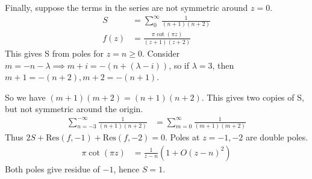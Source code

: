 \documentclass[a4paper, 11pt, normalem]{report}
\begin{document}
Finally, suppose the terms in the series are not symmetric around $z = 0$.
\begin{align}
    S &= \sum_0^\infty \frac{1}{(n+1)(n+2)} \\
    f(z) &= \frac{\pi\cot(\pi z)}{(z+1)(z+2)}
\end{align}
This gives S from poles for $z = n \geq 0$. 
Consider $m = -n-\lambda \implies m+i = -(n+(\lambda-i))$, so if $\lambda = 3$, then $m+1 = -(n+2), m+2 = -(n+1)$. 

So we have $(m+1)(m+2) = (n+1)(n+2)$. 
This gives two copies of S, but not symmetric around the origin.
\begin{align}
    \sum_{n=-3}^{-\infty} \frac{1}{(n+1)(n+2)} &= \sum_{m=0}^\infty \frac{1}{(m+1)(m+2)}
\end{align}
Thus $2S + \text{Res}(f, -1) + \text{Res}(f,-2) = 0$. 
Poles at $z = -1,-2$ are double poles. 
\begin{align}
\pi\cot(\pi z) &= \frac{1}{z-n}(1 + O(z-n)^2)
\end{align}
Both poles give residue of $-1$, hence $S = 1$.




\end{document}
